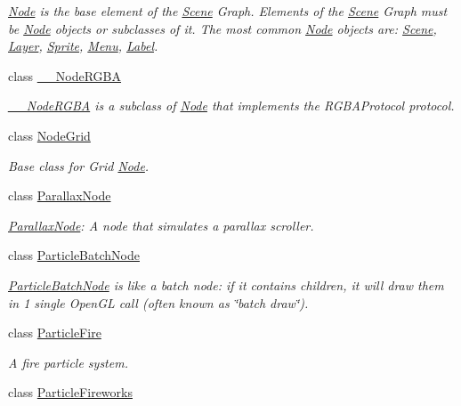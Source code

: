 \begin{DoxyCompactItemize}
\begin{DoxyCompactList}\small\item\em \hyperlink{classNode}{Node} is the base element of the \hyperlink{classScene}{Scene} Graph. Elements of the \hyperlink{classScene}{Scene} Graph must be \hyperlink{classNode}{Node} objects or subclasses of it. The most common \hyperlink{classNode}{Node} objects are\+: \hyperlink{classScene}{Scene}, \hyperlink{classLayer}{Layer}, \hyperlink{classSprite}{Sprite}, \hyperlink{classMenu}{Menu}, \hyperlink{classLabel}{Label}. \end{DoxyCompactList}\item 
class \hyperlink{class____NodeRGBA}{\+\_\+\+\_\+\+Node\+R\+G\+BA}
\begin{DoxyCompactList}\small\item\em \hyperlink{class____NodeRGBA}{\+\_\+\+\_\+\+Node\+R\+G\+BA} is a subclass of \hyperlink{classNode}{Node} that implements the R\+G\+B\+A\+Protocol protocol. \end{DoxyCompactList}\item 
class \hyperlink{classNodeGrid}{Node\+Grid}
\begin{DoxyCompactList}\small\item\em Base class for Grid \hyperlink{classNode}{Node}. \end{DoxyCompactList}\item 
class \hyperlink{classParallaxNode}{Parallax\+Node}
\begin{DoxyCompactList}\small\item\em \hyperlink{classParallaxNode}{Parallax\+Node}\+: A node that simulates a parallax scroller. \end{DoxyCompactList}\item 
class \hyperlink{classParticleBatchNode}{Particle\+Batch\+Node}
\begin{DoxyCompactList}\small\item\em \hyperlink{classParticleBatchNode}{Particle\+Batch\+Node} is like a batch node\+: if it contains children, it will draw them in 1 single Open\+GL call (often known as \char`\"{}batch draw\char`\"{}). \end{DoxyCompactList}\item 
class \hyperlink{classParticleFire}{Particle\+Fire}
\begin{DoxyCompactList}\small\item\em A fire particle system. \end{DoxyCompactList}\item 
class \hyperlink{classParticleFireworks}{Particle\+Fireworks}

\end{DoxyCompactItemize}
